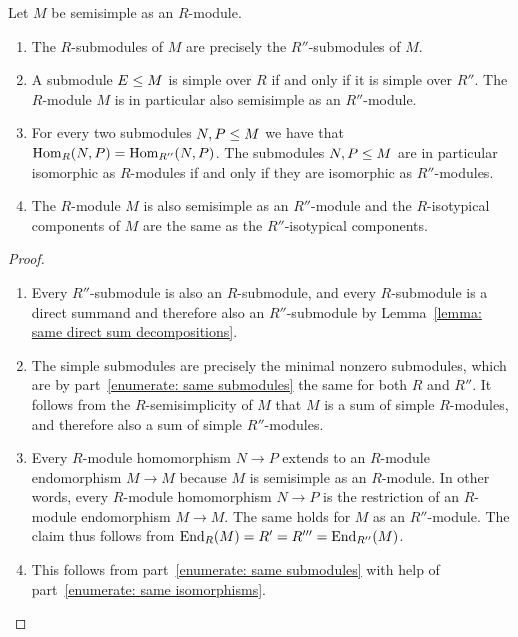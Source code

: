 \begin{proposition}
  Let $M$ be semisimple as an $R$-module.
  \begin{enumerate}
    \item
      \label{enumerate: same submodules}
      The $R$-submodules of $M$ are precisely the $R''$-submodules of $M$.
    \item
      A submodule $E \leq M$ is simple over $R$ if and only if it is simple over $R''$.
      The $R$-module $M$ is in particular also semisimple as an $R''$-module.
    \item
      \label{enumerate: same isomorphisms}
      For every two submodules $N, P \leq M$ we have that $\operatorname{Hom}_R(N,P) = \operatorname{Hom}_{R''}(N,P)$.
      The submodules $N, P \leq M$ are in particular isomorphic as $R$-modules if and only if they are isomorphic as $R''$-modules.
    \item
      The $R$-module $M$ is also semisimple as an $R''$-module and the $R$-isotypical components of $M$ are the same as the $R''$-isotypical components.
  \end{enumerate}
\end{proposition}


\begin{proof}
  \leavevmode
  \begin{enumerate}
    \item
      Every $R''$-submodule is also an $R$-submodule, and every $R$-submodule is a direct summand and therefore also an $R''$-submodule by Lemma~\ref{lemma: same direct sum decompositions}.
    \item
      The simple submodules are precisely the minimal nonzero submodules, which are by part~\ref*{enumerate: same submodules} the same for both $R$ and $R''$.
      It follows from the $R$-semisimplicity of $M$ that $M$ is a sum of simple $R$-modules, and therefore also a sum of simple $R''$-modules.
    \item
      Every $R$-module homomorphism $N \to P$ extends to an $R$-module endomorphism $M \to M$ because $M$ is semisimple as an $R$-module.
      In other words, every $R$-module homomorphism $N \to P$ is the restriction of an $R$-module endomorphism $M \to M$.
      The same holds for $M$ as an $R''$-module.
      The claim thus follows from $\operatorname{End}_R(M) = R' = R''' = \operatorname{End}_{R''}(M)$.
    \item
      This follows from part~\ref*{enumerate: same submodules} with help of part~\ref*{enumerate: same isomorphisms}.
    \qedhere
  \end{enumerate}
\end{proof}





